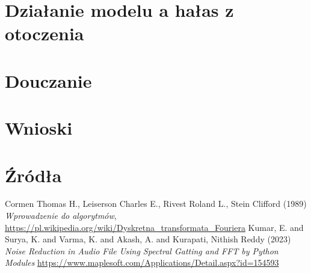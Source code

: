 \documentclass[polish]{article}
\begin{document}
\section{Działanie modelu a hałas z otoczenia}

\section{Douczanie}

\section{Wnioski}

\section{Źródła}
\begin{thebibliography}{2}
 Cormen Thomas H., Leiserson Charles E., Rivest Roland L., Stein Clifford (1989) \emph{Wprowadzenie do algorytmów},
\url{https://pl.wikipedia.org/wiki/Dyskretna_transformata_Fouriera}
Kumar, E. and Surya, K. and Varma, K. and Akash, A. and Kurapati, Nithish Reddy (2023) \emph{Noise Reduction in Audio File Using Spectral Gatting and FFT by Python Modules}
\url{https://www.maplesoft.com/Applications/Detail.aspx?id=154593}
\end{thebibliography}
\end{document}
